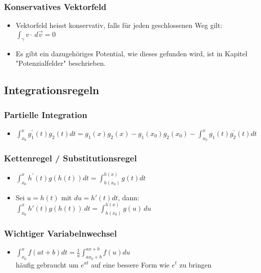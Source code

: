 \documentclass[a3paper, 11pt, landscape]{scrartcl}
\begin{document}
\begin{multicols*}{3}
\begin{itemize}
	\end{itemize}
	
	\subsubsection{Konservatives Vektorfeld}
	\begin{itemize}
	    \item Vektorfeld heisst konservativ, falls für jeden geschlossenen Weg gilt: $\int_\gamma v\cdot\,d\vec{v}=0$
	    \item Es gibt ein dazugehöriges Potential, wie dieses gefunden wird, ist in Kapitel "Potenzialfelder" beschrieben.
	\end{itemize}
	
	\subsection{Integrationsregeln}
	\subsubsection{Partielle Integration}
	\begin{itemize}
	    \item $\int_{x_{0}}^{x} g_{1}^{\prime}(t) g_{2}(t) d t=g_{1}(x) g_{2}(x)-g_{1}\left(x_{0}\right) g_{2}\left(x_{0}\right)-\int_{x_{0}}^{x} g_{1}(t) g_{2}^{\prime}(t) d t$
	\end{itemize}
	\subsubsection{Kettenregel / Substitutionsregel}
	\begin{itemize}
	    \item $\int_{x_{0}}^{x} h^{\prime}(t) g(h(t)) d t=\int_{h\left(x_{0}\right)}^{h(x)} g(t) d t$
	    \item Sei $u = h(t)$ mit $du=h'(t)dt$, dann: $\int_{x_0}^x h'(t)g(h(t))\,dt=\int_{h(x_0)}^{h(x)}g(u)\,du$
	\end{itemize}
	\subsubsection{Wichtiger Variabelnwechsel}
	\begin{itemize}
	    \item $\int_{x_{0}}^{x} f(a t+b) d t=\frac{1}{a} \int_{a x_{0}+b}^{a x+b} f(u) d u$\\
	    häufig gebraucht um $e^{at}$ auf eine bessere Form wie $e^t$ zu bringen
	\end{itemize}
	

\end{multicols*}
\end{document}
